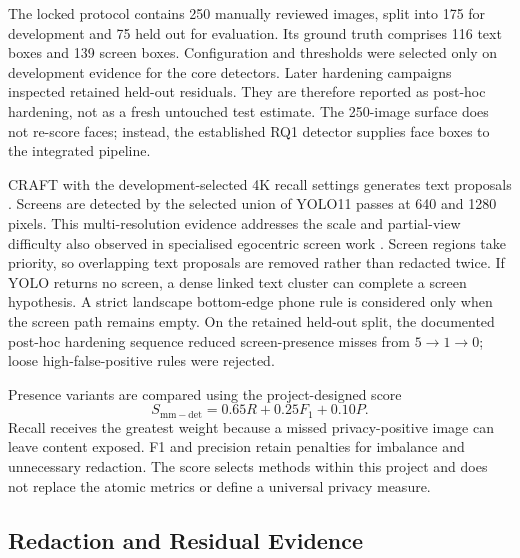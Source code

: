 \documentclass[10pt,twocolumn]{IEEEtran}
\begin{document}
The locked protocol contains 250 manually reviewed images, split into 175 for
development and 75 held out for evaluation. Its ground truth comprises 116 text
boxes and 139 screen boxes. Configuration and thresholds were selected only on
development evidence for the core detectors. Later hardening campaigns
inspected retained held-out residuals. They are therefore reported as post-hoc
hardening, not as a fresh untouched test estimate. The 250-image surface does not
re-score faces; instead, the established RQ1 detector supplies face boxes to
the integrated pipeline.

CRAFT with the development-selected 4K recall settings generates text proposals
\cite{baek2019craft}. Screens are detected by the selected union of YOLO11 passes
at 640 and 1280 pixels. This multi-resolution evidence addresses the scale and
partial-view difficulty also observed in specialised egocentric screen work
\cite{li2026screen}. Screen regions take priority, so overlapping text proposals
are removed rather than redacted twice. If YOLO returns no screen, a dense
linked text cluster can complete a screen hypothesis. A strict landscape
bottom-edge phone rule is considered only when the screen path remains empty.
On the retained held-out split, the documented post-hoc hardening sequence
reduced screen-presence misses from $5\rightarrow1\rightarrow0$; loose
high-false-positive rules were rejected.

Presence variants are compared using the project-designed score
\begin{equation}
S_{\mathrm{mm-det}}=0.65R+0.25F_{1}+0.10P .
\label{eq:mm-det}
\end{equation}
Recall receives the greatest weight because a missed privacy-positive image can
leave content exposed. F1 and precision retain penalties for imbalance and
unnecessary redaction. The score selects methods within this project and does
not replace the atomic metrics or define a universal privacy measure.

\subsection{Redaction and Residual Evidence}
\end{document}
